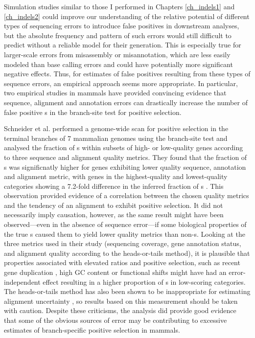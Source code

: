 Simulation studies similar to those I performed in Chapters
\ref{ch_indels1} and \ref{ch_indels2} could improve our understanding
of the relative potential of different types of sequencing errors to
introduce false positives in downstream analyses, but the absolute
frequency and pattern of such errors would still difficult to predict
without a reliable model for their generation. This is especially true
for larger-scale errors from misassembly or misannotation, which are
less easily modeled than base calling errors and could have
potentially more significant negative effects. Thus, for estimates of
false positives resulting from these types of sequence errors, an
empirical approach seems more appropriate. In particular, two
empirical studies in mammals have provided convincing evidence that
sequence, alignment and annotation errors can drastically increase the
number of false positive \psg{}s in the branch-site test for positive
selection.

Schneider et al. \citeyearpar{Schneider2009} performed a genome-wide
scan for positive selection in the terminal branches of 7 mammalian
genomes using the branch-site test and analysed the fraction of
\psg{}s within subsets of high- or low-quality genes according to
three sequence and alignment quality metrics. They found that the
fraction of \psg{}s was significnatly higher for genes exhibiting
lower quality sequence, annotation and alignment metric, with genes in
the highest-quality and lowest-quality categories showing a 7.2-fold
difference in the inferred fraction of \psg{}s
\citep{Schneider2009}. This observation provided evidence of a
correlation between the chosen quality metrics and the tendency of an
alignment to exhibit positive selection. It did not necessarily imply
causation, however, as the same result might have been observed---even
in the absence of sequence error---if some biological properties of
the true \psg{}s caused them to yield lower quality metrics than
non-\psg{}s. Looking at the three metrics used in their study
(sequencing coverage, gene annotation status, and alignment quality
according to the heads-or-tails method), it is plausible that
properties associated with elevated \omg ratios and positive
selection, such as recent gene duplication
\citep{Beisswanger2008,Studer2008,Casola2009}, high GC content
\citep{Ratnakumar2010} or functional shifts \citep{Storz2008,Wang2001}
might have had an error-independent effect resulting in a higher
proportion of \psg{}s in low-scoring categories. The heads-or-tails
method has also been shown to be inappropriate for estimating
alignment uncertainty \citep{Fletcher2010}, so results based on this
measurement should be taken with caution. Despite these criticisms,
the analysis did provide good evidence that some of the obvious
sources of error may be contributing to excessive estimates of
branch-specific positive selection in mammals.


